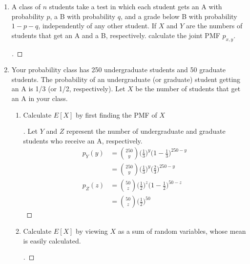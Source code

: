 \documentclass[paper=usletter, fontsize=12pt]{article}
\begin{document}
\begin{enumerate}[label=\textbf{\arabic*}.]
        \item
        A class of $n$ students take a test in which each student gets an A
        with probability $p$, a B with probability $q$, and a grade below B
        with probability $1 - p - q$, independently of any other student. If
        $X$ and $Y$ are the numbers of students that get an A and a B,
        respectively. calculate the joint PMF $p_{x,y}$.
        \begin{proof}[\unskip\nopunct]
        \end{proof}
        \vspace{0.2in}

        \item
        Your probability class has 250 undergraduate students and 50 graduate
        students. The probability of an undergraduate (or graduate) student
        getting an A is 1/3 (or 1/2, respectively). Let $X$ be the number of
        students that get an A in your class.
        \begin{enumerate}[label=(\alph*)]

            \item Calculate $E[X]$ by first finding the PMF of $X$
            \begin{proof}[\unskip\nopunct]
                Let $Y$ and $Z$ represent the number of undergraduate and
                graduate students who receive an A, respectively.
                \begingroup
                \addtolength{\jot}{1em}
                \begin{align*}
                    p_Y(y) & = \binom{250}{y}\bigg( \frac{1}{3} \bigg)^y\bigg( 1 - \frac{1}{3} \bigg)^{250-y}\\
                    & = \binom{250}{y}\bigg( \frac{1}{3} \bigg)^y\bigg( \frac{2}{3} \bigg)^{250-y} \\
                    p_Z(z) & = \binom{50}{z}\bigg( \frac{1}{2} \bigg)^z\bigg( 1 - \frac{1}{2} \bigg)^{50-z}\\
                    & = \binom{50}{z}\bigg( \frac{1}{2} \bigg)^{50}
                \end{align*}
                \endgroup
            \end{proof}
            \vspace{0.2in}

            \item Calculate $E[X]$ by viewing $X$ as a sum of random variables,
            whose mean is easily calculated.
            \begin{proof}[\unskip\nopunct]
            \end{proof}
            \vspace{0.2in}


\end{enumerate}
\end{enumerate}
\end{document}
